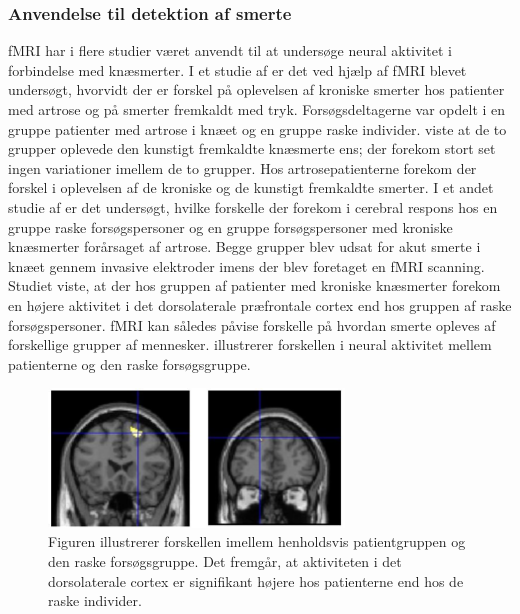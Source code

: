 \subsubsection{Anvendelse til detektion af smerte}
fMRI har i flere studier været anvendt til at undersøge neural aktivitet i forbindelse med knæsmerter.
I et studie af \citep{Parks2012} er det ved hjælp af fMRI blevet undersøgt, hvorvidt der er forskel på oplevelsen af kroniske smerter hos patienter med artrose og på smerter fremkaldt med tryk. Forsøgsdeltagerne var opdelt i en gruppe patienter med artrose i knæet og en gruppe raske individer. \cite{Parks2012} viste at de to grupper oplevede den kunstigt fremkaldte knæsmerte ens; der forekom stort set ingen variationer imellem de to grupper. Hos artrosepatienterne forekom der forskel i oplevelsen af de kroniske og de kunstigt fremkaldte smerter. \citep{Parks2012} 
I et andet studie af \citep{Hiramatsu2014} er det undersøgt, hvilke forskelle der forekom i cerebral respons hos en gruppe raske forsøgspersoner og en gruppe forsøgspersoner med kroniske knæsmerter forårsaget af artrose. Begge grupper blev udsat for akut smerte i knæet gennem invasive elektroder imens der blev foretaget en fMRI scanning. Studiet viste, at der hos gruppen af patienter med kroniske knæsmerter forekom en højere aktivitet i det dorsolaterale præfrontale cortex end hos gruppen af raske forsøgspersoner. \citep{Hiramatsu2014} 
fMRI kan således påvise forskelle på hvordan smerte opleves af forskellige grupper af mennesker.  illustrerer forskellen i neural aktivitet mellem patienterne og den raske forsøgsgruppe.
\begin{figure}[H] 
	\begin{center}
		\includegraphics[width=0.7\textwidth]{figures/bProblemanalyse/fMRI_dorsolateral}
	\end{center}
	\caption{Figuren illustrerer forskellen imellem henholdsvis patientgruppen og den raske forsøgsgruppe. Det fremgår, at aktiviteten i det dorsolaterale cortex er signifikant højere hos patienterne end hos de raske individer. \citep{Hiramatsu2014}} 
	\label{fig:fMRI_result} 
\end{figure} 

